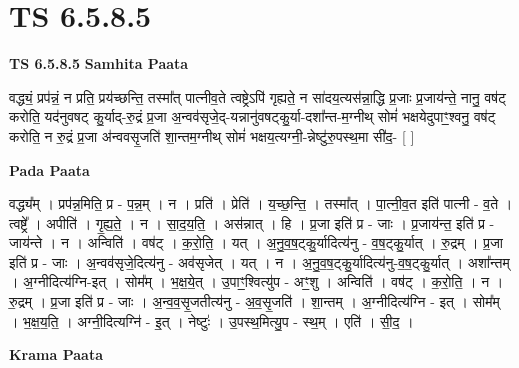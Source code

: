 \documentclass[17pt]{extarticle}
\begin{document}
\section{ TS 6.5.8.5 }

\textbf{TS 6.5.8.5 } \newline
\textbf{Samhita Paata} \newline

वद्ध्यं॒ प्रप॑न्नं॒ न प्रति॒ प्रय॑च्छन्ति॒ तस्मा᳚त् पात्नीव॒ते त्वष्ट्रेऽपि॑ गृह्यते॒ न सा॑दय॒त्यस॑न्ना॒द्धि प्र॒जाः प्र॒जाय॑न्ते॒ नानु॒ वष॑ट् करोति॒ यद॑नुवषट् कु॒र्याद्-रु॒द्रं प्र॒जा अ॒न्वव॑सृजे॒द्-यन्नानु॑वषट्कु॒र्या-दशा᳚न्त-म॒ग्नीथ् सोमं॑ भक्षयेदुपाꣳ॒॒श्वनु॒ वष॑ट् करोति॒ न रु॒द्रं प्र॒जा अ॑न्ववसृ॒जति॑ शा॒न्तम॒ग्नीथ् सोमं॑ भक्षय॒त्यग्नी॒-न्नेष्टु॑रु॒पस्थ॒मा सी॑द॒- [  ] \newline

\textbf{Pada Paata} \newline

वद्ध्य᳚म् । प्रप॑न्न॒मिति॒ प्र - प॒न्न॒म् । न । प्रति॑ । प्रेति॑ । य॒च्छ॒न्ति॒ । तस्मा᳚त् । पा॒त्नी॒व॒त इति॑ पात्नी - व॒ते । त्वष्ट्रे᳚ । अपीति॑ । गृ॒ह्य॒ते॒ । न । सा॒द॒य॒ति॒ । अस॑न्नात् । हि । प्र॒जा इति॑ प्र - जाः । प्र॒जाय॑न्त॒ इति॑ प्र - जाय॑न्ते । न । अन्विति॑ । वष॑ट् । क॒रो॒ति॒ । यत् । अ॒नु॒व॒ष॒ट्कु॒र्यादित्य॑नु - व॒ष॒ट्कु॒र्यात् । रु॒द्रम् । प्र॒जा इति॑ प्र - जाः । अ॒न्वव॑सृजे॒दित्य॑नु - अव॑सृजेत् । यत् । न । अ॒नु॒व॒ष॒ट्कु॒र्यादित्य॑नु-व॒ष॒ट्कु॒र्यात् । अशा᳚न्तम् । अ॒ग्नीदित्य॑ग्नि-इत् । सोम᳚म् । भ॒क्ष॒ये॒त् ।  उ॒पाꣳ॒॒श्वित्यु॑प - अꣳ॒॒शु । अन्विति॑ । वष॑ट् । क॒रो॒ति॒ । न । रु॒द्रम् । प्र॒जा इति॑ प्र - जाः । अ॒न्व॒व॒सृ॒जतीत्य॑नु - अ॒व॒सृ॒जति॑ । शा॒न्तम् । अ॒ग्नीदित्य॑ग्नि - इत् । सोम᳚म् । भ॒क्ष॒य॒ति॒ । अग्नी॒दित्यग्नि॑ - इ॒त् । नेष्टुः॑ । उ॒पस्थ॒मित्यु॒प - स्थ॒म् । एति॑ । सी॒द॒ ।  \newline


\textbf{Krama Paata} \newline
\end{document}
